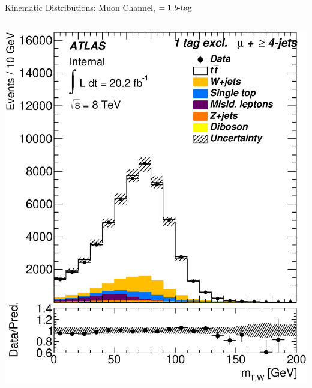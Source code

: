 \documentclass{beamer}
\begin{document}
{\begin{frame}{Kinematic Distributions: Muon Channel, $=1\text{ } \lowercase{ b\text{-tag}}$}
\begin{columns}
      \includegraphics[width=.95\textwidth]{../chapters/whel/figures/control_Plots2/bTag_1excl/TransverseMass_mu}
    \end{columns}
  \end{frame}

}
\end{document}
